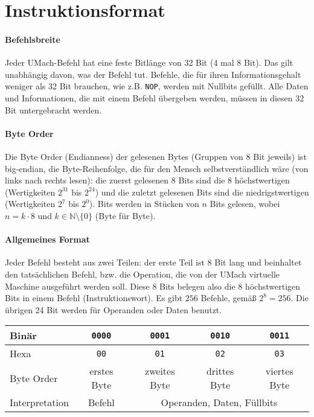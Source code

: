 \section{Instruktionsformat}

\paragraph{Befehlsbreite}
Jeder UMach-Befehl hat eine feste Bitlänge von 32 Bit (4 mal 8 Bit).
Das gilt unabhängig davon, was der Befehl tut. Befehle, die für ihren
Informationsgehalt weniger als 32 Bit brauchen, wie z.B. \texttt{NOP},
werden mit Nullbits gefüllt. Alle Daten und Informationen, die mit einem
Befehl übergeben werden, müssen in diesen 32 Bit untergebracht werden.

\paragraph{Byte Order}
Die Byte Order (Endianness) der gelesenen \glspl{Byte} (Gruppen von 8 Bit jeweils) ist
big-endian, die Byte-Reihenfolge, die für den Mensch selbstverständlich wäre
(von links nach rechts lesen):
die zuerst gelesenen 8 Bits sind die 8 höchstwertigen (Wertigkeiten $2^{31}$ bis
$2^{24}$) und die zuletzt gelesenen Bits sind die niedrigstwertigen
(Wertigkeiten $2^{7}$ bis $2^{0}$).
Bits werden in Stücken von $n$ Bits gelesen, wobei $n = k \cdot 8$ und
$k \in \mathbb{N} \setminus\{0\}$ (Byte für Byte).


\paragraph{Allgemeines Format}
Jeder Befehl besteht aus zwei Teilen: der erste Teil ist 8 Bit lang und
beinhaltet den tatsächlichen Befehl, bzw. die Operation, die von der UMach
virtuelle Maschine ausgeführt werden soll.
Diese 8 Bits belegen also die 8 höchstwertigen Bits in einem Befehl
(Instruktionswort).
Es gibt $256$ Befehle, gemäß $2^{8} = 256$.
Die übrigen 24 Bit werden für Operanden oder Daten benutzt.

\begin{center}
  \begin{tabular}{l|*{4}{c|}}
    Binär &
    \texttt{0000} & \texttt{0001} & \texttt{0010} & \texttt{0011} \\\hline
    Hexa  &
    \texttt{00}   & \texttt{01}   & \texttt{02}   & \texttt{03}   \\\hline
    Byte Order &
    erstes Byte   & zweites Byte  & drittes Byte  & viertes Byte  \\\hline
    Interpretation &
    Befehl    &  \multicolumn{3}{c|}{Operanden, Daten, Füllbits} \\\hline
  \end{tabular}
\end{center}


